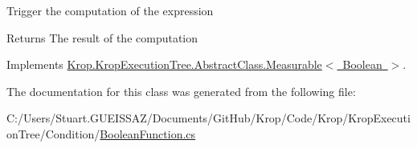 Trigger the computation of the expression 

\begin{DoxyReturn}{Returns}
The result of the computation 
\end{DoxyReturn}


Implements \mbox{\hyperlink{class_krop_1_1_krop_execution_tree_1_1_abstract_class_1_1_measurable_afe91c739e2db11c8f316b07e8f55f7bb}{Krop.\+Krop\+Execution\+Tree.\+Abstract\+Class.\+Measurable$<$ Boolean $>$}}.



The documentation for this class was generated from the following file\+:\begin{DoxyCompactItemize}
\item 
C\+:/\+Users/\+Stuart.\+G\+U\+E\+I\+S\+S\+A\+Z/\+Documents/\+Git\+Hub/\+Krop/\+Code/\+Krop/\+Krop\+Execution\+Tree/\+Condition/\mbox{\hyperlink{_boolean_function_8cs}{Boolean\+Function.\+cs}}\end{DoxyCompactItemize}
